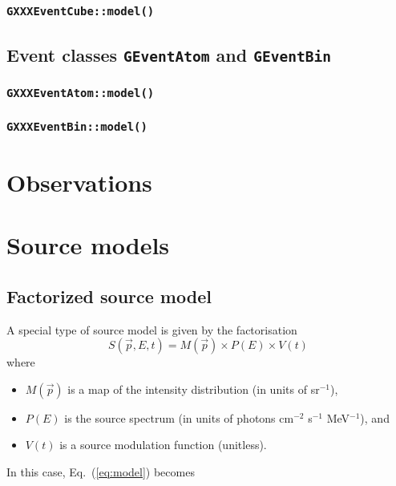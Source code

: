 \documentclass{article}[12pt,a4]
\begin{document}
\subsubsection{{\tt GXXXEventCube::model()}}

\subsection{Event classes {\tt GEventAtom} and {\tt GEventBin}}
\label{sec:GEvent}


\subsubsection{{\tt GXXXEventAtom::model()}}

\subsubsection{{\tt GXXXEventBin::model()}}



\section{Observations}
\label{sec:GObservation}


\section{Source models}

\subsection{Factorized source model}

A special type of source model is given by the factorisation
\begin{equation}
S(\vec{p}, E, t) = M(\vec{p}) \times P(E) \times V(t)
\end{equation}
where
\begin{itemize}
\item[] $M(\vec{p})$ is a map of the intensity distribution (in units of sr$^{-1}$),
\item[] $P(E)$ is the source spectrum (in units of photons cm$^{-2}$ s$^{-1}$ MeV$^{-1}$), and
\item[] $V(t)$ is a source modulation function (unitless).
\end{itemize}
In this case, Eq.~(\ref{eq:model}) becomes
\end{document}
